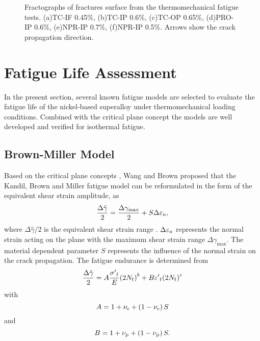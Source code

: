 \documentclass[preprint,5p,twocolumn,11pt,sort&compress]{elsarticle}
\begin{document}
\begin{figure*}
  \caption{Fractographs of fractures surface from the thermomechanical fatigue tests. (a)TC-IF 0.45\%, (b)TC-IP 0.6\%, (c)TC-OP 0.65\%, (d)PRO-IP 0.6\%, (e)NPR-IP 0.7\%, (f)NPR-IP 0.5\%.  Arrows show the crack propagation direction.}
  \label{Fig:crack_propagation}
\end{figure*}

\section{Fatigue Life Assessment}

In the present section, several known fatigue models are selected to evaluate the fatigue life of the nickel-based superalloy under thermomechanical loading conditions. Combined with the critical plane concept the models are well developed and verified for isothermal fatigue.

\subsection{Brown-Miller Model}
Based on the critical plane concepts \cite{Brown2006}, Wang and Brown \cite{Wang1993} proposed that the Kandil, Brown and Miller fatigue model \cite{Kandil1982} can be reformulated in the form of the equivalent shear strain amplitude, as
\begin{equation}
\frac{{\Delta \hat \gamma }}{2} = \frac{{\Delta {\gamma _{\max}}}}{2} + S\Delta {\varepsilon _{\rm n}},
\label{Equ:ShearStrainBM}
\end{equation}
where ${{\Delta \hat \gamma }}/{2}$ is the equivalent shear strain range \cite{Wang1993}. $\Delta {\varepsilon _{\rm n}}$ represents the normal strain acting on the plane with the maximum shear strain range $\Delta {\gamma _{\max}}$. The material dependent parameter $S$ represents the influence of the normal strain on the crack propagation.
The fatigue endurance is determined from 
\begin{equation}
\frac{{\Delta \hat \gamma }}{2} = A\frac{{{{\sigma '}_{\rm f}}}}{E}{\left( {2{N_{\rm f}}} \right)^b} + B{{\varepsilon '}_{\rm f}}{\left( {2{N_{\rm f}}} \right)^c}
\end{equation}
with
\[A = 1 + {\nu _{\rm e}} + \left( {1 - {\nu _{\rm e}}} \right)S\]
and
\[B = 1 + {\nu _{\rm p}} + \left( {1 - {\nu _{\rm p}}} \right)S.\]
\end{document}
